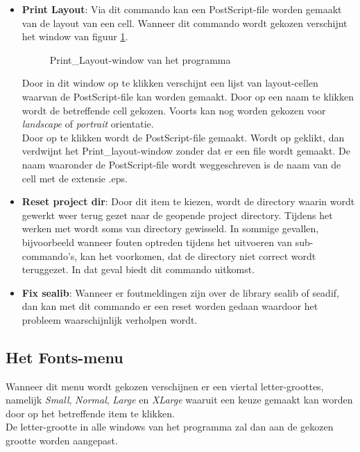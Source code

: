 \begin{itemize}
\item {\bf Print Layout}: Via dit commando kan een PostScript-file worden gemaakt van de
                     layout van een cell.
                    Wanneer dit commando wordt gekozen verschijnt het window van
                    figuur \ref{pr-layout-window}.
                    \begin{figure}[htb]
                    \centerline{}
                    \caption{Print\_Layout-window van het programma }
                    \label{pr-layout-window}
                    \end{figure}
                    Door in dit window op  te klikken verschijnt een lijst
                    van layout-cellen waarvan de PostScript-file kan worden gemaakt.
                    Door op een naam te klikken wordt de betreffende cell gekozen.
		    Voorts kan nog worden gekozen voor {\it landscape} of {\it portrait} orientatie.\\
                    Door op  te klikken wordt de PostScript-file gemaakt. Wordt
                    op  ge\-klikt, dan verdwijnt het Print\_layout-window
                    zonder dat er een file wordt gemaakt.
                    De naam waaronder de PostScript-file wordt weggeschreven is de
                    naam van de cell met de extensie .eps.
\item {\bf Reset project dir}: Door dit item te kiezen, wordt de directory waarin wordt
                    gewerkt weer terug gezet naar de geopende project directory.
                    Tijdens het werken met  
                    wordt soms van directory gewisseld.
                    In sommige gevallen, bijvoorbeeld wanneer fouten
                    optreden tijdens het uitvoeren van sub-commando's,
                    kan het voorkomen, dat de directory niet correct wordt
                    teruggezet. In dat geval biedt dit commando uitkomst.
\item {\bf Fix sealib}: Wanneer er foutmeldingen zijn over de library sealib of seadif, dan kan
                    met dit commando er een reset worden gedaan waardoor het probleem
                    waarschijnlijk verholpen wordt.
\end{itemize}

\subsection{Het Fonts-menu}
Wanneer dit menu wordt gekozen verschijnen er een viertal letter-groottes, namelijk
{\it Small}, {\it Normal}, {\it Large} en {\it XLarge} waaruit een keuze gemaakt kan worden
door op het betreffende item te klikken.\\
De letter-grootte in alle windows van het programma  zal dan
aan de gekozen grootte worden aangepast.

